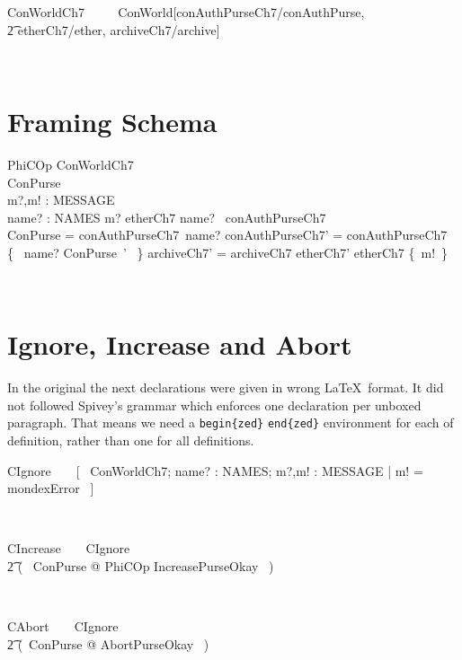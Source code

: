 \begin{LNewSDef}
\begin{zed}
    ConWorldCh7 ~~~~ ConWorld[conAuthPurseCh7/conAuthPurse, \\
                        \t2 etherCh7/ether, archiveCh7/archive]
\end{zed}~\end{LNewSDef}

\section{Framing Schema}\label{ch7.PhiCOp}

\begin{LSDef}
\begin{schema}{PhiCOp}
  \Delta ConWorldCh7
  \\      \Delta ConPurse
  \\      m?,m! : MESSAGE
  \\      name? : NAMES
  \where
  m? \in etherCh7
  \also
  name? \in \dom~conAuthPurseCh7
  \\      \theta ConPurse = conAuthPurseCh7~name?
  \also
  conAuthPurseCh7' = conAuthPurseCh7 \oplus \{~ name? \mapsto \theta ConPurse~' ~\}
  \also
  archiveCh7' = archiveCh7
  \also
  etherCh7' \subseteq etherCh7 \cup \{~m!~\}
\end{schema}~\end{LSDef}

\section{Ignore, Increase and Abort}

In the original the next declarations were given in wrong \LaTeX\ format. It
did not followed Spivey's grammar which enforces one declaration per unboxed
paragraph. That means we need a \verb|begin{zed}| \verb|end{zed}| environment
for each of definition, rather than one for all definitions.
%
\begin{LSDef}
\begin{zed}
  CIgnore~~~~[~ \Xi ConWorldCh7; name? : NAMES; m?,m! : MESSAGE | m! = mondexError ~]
\end{zed}~\end{LSDef}

\begin{LSDef}
\begin{zed}
  CIncrease~~~~CIgnore
  \\ \t2  \lor (~ \exists \Delta ConPurse @ PhiCOp \land IncreasePurseOkay ~)
\end{zed}~\end{LSDef}
%
\begin{LSDef}
\begin{zed}
  CAbort~~~~CIgnore
  \\ \t2          \lor (~\exists \Delta ConPurse @
  AbortPurseOkay \land [~ PhiCOp | m! = mondexError ~]~)
\end{zed}~\end{LSDef}

